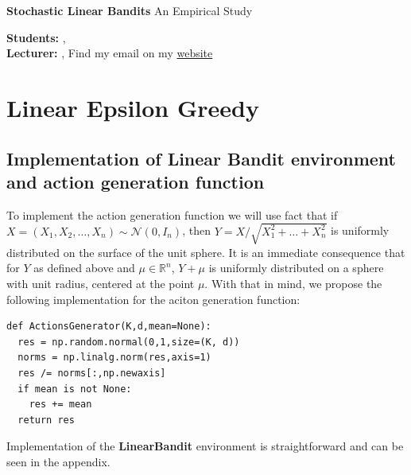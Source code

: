 





\begin{Large}
    \textsf{\textbf{Stochastic Linear Bandits}}
    An Empirical Study
\end{Large}

\vspace{1ex}

\textsf{\textbf{Students:}} , \\
\textsf{\textbf{Lecturer:}} , Find my email on my \href{www.cvernade.com}{website}
\vspace{2ex}

\section{Linear Epsilon Greedy}
\subsection{Implementation of Linear Bandit environment and action generation function}
To implement the action generation function we will use fact that if $ X = (X_1, X_2, \ldots, X_n) \sim \mathcal{N}(0, I_n) $, 
then $ Y = X / \sqrt{X_1^2 + \ldots + X_n^2} $ is uniformly distributed on the surface of the unit sphere. It is an immediate
consequence that for $Y$ as defined above and $\mu \in \mathbb{R}^n$, $ Y + \mu$ is uniformly distributed on a sphere with unit radius,
centered at the point $\mu$. With that in mind, we propose the following implementation for the aciton generation function:
\begin{verbatim}
def ActionsGenerator(K,d,mean=None):
  res = np.random.normal(0,1,size=(K, d))
  norms = np.linalg.norm(res,axis=1)
  res /= norms[:,np.newaxis]
  if mean is not None:
    res += mean
  return res
\end{verbatim}
Implementation of the \textbf{LinearBandit} environment is straightforward and can be seen in the appendix.
